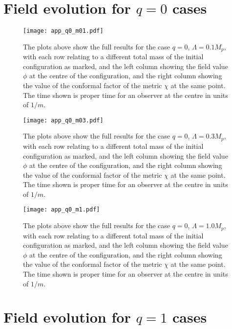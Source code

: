\documentclass[11pt,a4paper]{article}
\begin{document}
\clearpage
\section{Field evolution for $q = 0$ cases}


\label{app:q0}
\begin{figure}[h!]\centering
\texttt{[image: app\_q0\_m01.pdf]}
\caption{The plots above show the full results for the case $q=0$, $\Lambda=0.1 M_p$, with each row relating to a different total mass of the initial configuration as marked, and the left column showing the field value $\phi$ at the centre of the configuration, and the right column showing the value of the conformal factor of the metric $\chi$ at the same point.  The time shown is proper time for an observer at the centre in units of $1/m$.}
\end{figure}
\pagebreak
\begin{figure}[h!]\centering
\texttt{[image: app\_q0\_m03.pdf]}
\caption{The plots above show the full results for the case $q=0$, $\Lambda=0.3 M_p$, with each row relating to a different total mass of the initial configuration as marked, and the left column showing the field value $\phi$ at the centre of the configuration, and the right column showing the value of the conformal factor of the metric $\chi$ at the same point.  The time shown is proper time for an observer at the centre in units of $1/m$.}
\end{figure}
\pagebreak
\begin{figure}[h!]\centering
\texttt{[image: app\_q0\_m1.pdf]}
\caption{The plots above show the full results for the case $q=0$, $\Lambda=1.0 M_p$, with each row relating to a different total mass of the initial configuration as marked, and the left column showing the field value $\phi$ at the centre of the configuration, and the right column showing the value of the conformal factor of the metric $\chi$ at the same point.  The time shown is proper time for an observer at the centre in units of $1/m$.}
\end{figure}
\pagebreak

\clearpage
\section{Field evolution for $q = 1$ cases}
\label{app:q1}
\end{document}
